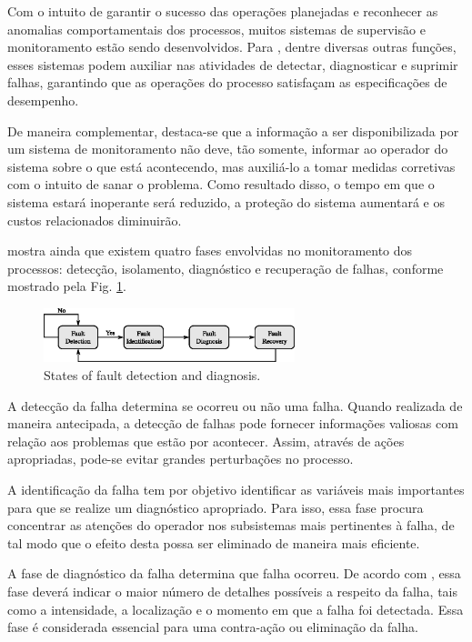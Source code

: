 \documentclass[10pt,fleqn,a4paper]{article}
\begin{document}
Com o intuito de garantir o sucesso das operações planejadas e reconhecer as
anomalias comportamentais dos processos, muitos sistemas de supervisão e
monitoramento estão sendo desenvolvidos. Para \citet{chiang:2001}, dentre
diversas outras funções, esses sistemas podem auxiliar nas atividades de
detectar, diagnosticar e suprimir falhas, garantindo que as operações do
processo satisfaçam as especificações de desempenho.

De maneira complementar, destaca-se que a informação a ser disponibilizada por
um sistema de monitoramento não deve, tão somente, informar ao operador do
sistema sobre o que está acontecendo, mas auxiliá-lo a tomar medidas corretivas
com o intuito de sanar o problema. Como resultado disso, o tempo em que o
sistema estará inoperante será reduzido, a proteção do sistema aumentará e os
custos relacionados diminuirão.

\citet{chiang:2001} mostra ainda que existem quatro fases envolvidas no
monitoramento dos processos: detecção, isolamento, diagnóstico e recuperação de
falhas, conforme mostrado pela Fig. \ref{fig:states}.

\begin{figure}[htb]
\centering
    \includegraphics[width=0.65\textwidth]{imgs/states}
    \caption{States of fault detection and diagnosis.}
    \label{fig:states}
\end{figure}

A detecção da falha determina se ocorreu ou não uma falha. Quando realizada de
maneira antecipada, a detecção de falhas pode fornecer informações valiosas com
relação aos problemas que estão por acontecer. Assim, através de ações
apropriadas, pode-se evitar grandes perturbações no processo.

A identificação da falha tem por objetivo identificar as variáveis mais
importantes para que se realize um diagnóstico apropriado. Para isso, essa fase
procura concentrar as atenções do operador nos subsistemas mais pertinentes à
falha, de tal modo que o efeito desta possa ser eliminado de maneira mais
eficiente.

A fase de diagnóstico da falha determina que falha ocorreu. De acordo com
\citet{isermann:2004}, essa fase deverá indicar o maior número de detalhes
possíveis a respeito da falha, tais como a intensidade, a localização e o
momento em que a falha foi detectada. Essa fase é considerada essencial para uma
contra-ação ou eliminação da falha.
\end{document}
